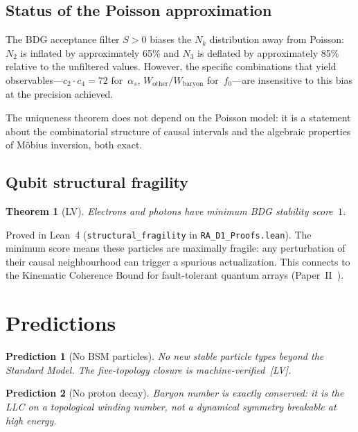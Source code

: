 \documentclass[12pt,a4paper]{article}
\newtheorem{theorem}{Theorem}[section]
\newtheorem{prediction}{Prediction}
\begin{document}
\subsection{Status of the Poisson approximation}\label{sec:poisson_status}

The BDG acceptance filter $S>0$ biases the $N_k$ distribution away from Poisson: $N_2$ is inflated by approximately 65\% and $N_3$ is deflated by approximately 85\% relative to the unfiltered values. However, the specific combinations that yield observables---$c_2 \cdot c_4 = 72$ for~$\alpha_s$, $W_{\mathrm{other}}/W_{\mathrm{baryon}}$ for~$f_0$---are insensitive to this bias at the precision achieved.

The uniqueness theorem does not depend on the Poisson model: it is a statement about the combinatorial structure of causal intervals and the algebraic properties of M\"obius inversion, both exact.

\subsection{Qubit structural fragility}\label{sec:fragility}

\begin{theorem}[LV]\label{thm:fragility}
Electrons and photons have minimum BDG stability score~$1$.
\end{theorem}

Proved in Lean~4 (\texttt{structural\_fragility} in \texttt{RA\_D1\_Proofs.lean}). The minimum score means these particles are maximally fragile: any perturbation of their causal neighbourhood can trigger a spurious actualization. This connects to the Kinematic Coherence Bound for fault-tolerant quantum arrays (Paper~II~\cite{P2}).

\section{Predictions}\label{sec:predictions}

\begin{prediction}[No BSM particles]\label{pred:bsm}
No new stable particle types beyond the Standard Model. The five-topology closure is machine-verified~[LV].
\end{prediction}

\begin{prediction}[No proton decay]\label{pred:proton}
Baryon number is exactly conserved: it is the LLC on a topological winding number, not a dynamical symmetry breakable at high energy.
\end{prediction}
\end{document}
